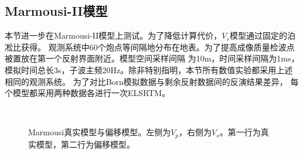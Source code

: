 \subsection{Marmousi-II模型}
本节进一步在Marmousi-II模型上测试。为了降低计算代价，$V_s$模型通过固定的泊凇比获得。
观测系统中60个炮点等间隔地分布在地表。为了提高成像质量检波点被置放在第一个反射界面附近。模型空间采样间隔
为10m，时间采样间隔为1ms，模拟时间总长3s，子波主频20Hz。除非特别指明，本节所有数值实验都采用上述相同的观测系统。
为了对比Born模拟数据与剩余反射数据间的反演结果差异，
每个模型都采用两种数据各进行一次ELSRTM。
\begin{figure}[!htb]
   \centering
   \\
   \caption{Marmousi真实模型与偏移模型。左侧为$V_p$，右侧为$V_s$。第一行为真实模型，第二行为偏移模型。}
   \label{fig:TrueAndInitial_1}
\end{figure}
